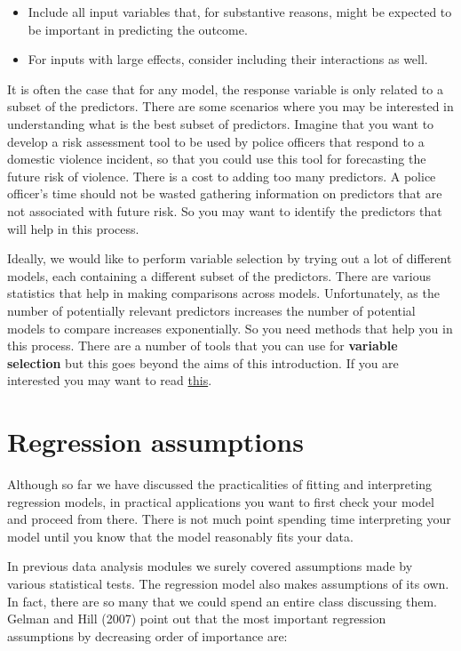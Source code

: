 \documentclass[]{book}
\begin{document}
\begin{itemize}
\item
  Include all input variables that, for substantive reasons, might be expected to be important in predicting the outcome.
\item
  For inputs with large effects, consider including their interactions as well.
\end{itemize}

It is often the case that for any model, the response variable is only related to a subset of the predictors. There are some scenarios where you may be interested in understanding what is the best subset of predictors. Imagine that you want to develop a risk assessment tool to be used by police officers that respond to a domestic violence incident, so that you could use this tool for forecasting the future risk of violence. There is a cost to adding too many predictors. A police officer's time should not be wasted gathering information on predictors that are not associated with future risk. So you may want to identify the predictors that will help in this process.

Ideally, we would like to perform variable selection by trying out a lot of different models, each containing a different subset of the predictors. There are various statistics that help in making comparisons across models. Unfortunately, as the number of potentially relevant predictors increases the number of potential models to compare increases exponentially. So you need methods that help you in this process. There are a number of tools that you can use for \textbf{variable selection} but this goes beyond the aims of this introduction. If you are interested you may want to read \href{http://link.springer.com/chapter/10.1007/978-1-4614-7138-7_6}{this}.

\hypertarget{regression-assumptions}{%
\section{Regression assumptions}\label{regression-assumptions}}

Although so far we have discussed the practicalities of fitting and interpreting regression models, in practical applications you want to first check your model and proceed from there. There is not much point spending time interpreting your model until you know that the model reasonably fits your data.

In previous data analysis modules we surely covered assumptions made by various statistical tests. The regression model also makes assumptions of its own. In fact, there are so many that we could spend an entire class discussing them. Gelman and Hill (2007) point out that the most important regression assumptions by decreasing order of importance are:
\end{document}
